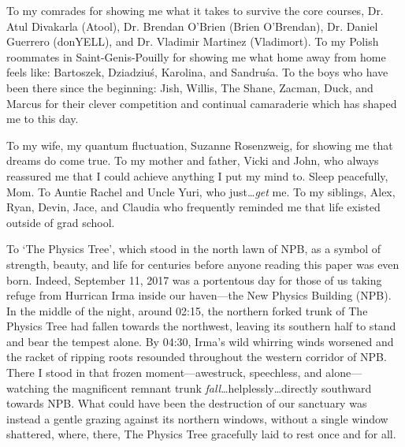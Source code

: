 


To my comrades for showing me what it takes to survive the core courses, Dr. Atul Divakarla (Atool), Dr. Brendan O'Brien (Brien O'Brendan), Dr. Daniel Guerrero (donYELL), and Dr. Vladimir Martinez (Vladimort).
To my Polish roommates in Saint-Genis-Pouilly for showing me what home away from home feels like: Bartoszek, Dziadziuś, Karolina, and Sandruśa.
To the boys who have been there since the beginning: Jish, Willis, The Shane, Zacman, Duck, and Marcus for their clever competition and continual camaraderie which has shaped me to this day.

To my wife, my quantum fluctuation, Suzanne Rosenzweig, for showing me that dreams do come true.
To my mother and father, Vicki and John, who always reassured me that I could achieve anything I put my mind to. Sleep peacefully, Mom.
To Auntie Rachel and Uncle Yuri, who just\ldots \emph{get} me. %
To my siblings, Alex, Ryan, Devin, Jace, and Claudia who frequently reminded me that life existed outside of grad school.


To `The Physics Tree', which stood in the north lawn of NPB, as a symbol of strength, beauty, and life for centuries before anyone reading this paper was even born.
Indeed, September 11, 2017 was a portentous day for those of us taking refuge from Hurrican Irma inside our haven---the New Physics Building (NPB).
In the middle of the night, around 02:15, the northern forked trunk of The Physics Tree had fallen towards the northwest, leaving its southern half to stand and bear the tempest alone.
By 04:30, Irma's wild whirring winds worsened and the racket of ripping roots resounded throughout the western corridor of NPB.
There I stood in that frozen moment---awestruck, speechless, and alone---watching the magnificent remnant trunk \emph{fall}\ldots helplessly\ldots directly southward towards NPB.
What could have been the destruction of our sanctuary was instead a gentle grazing against its northern windows, without a single window shattered, where, there, The Physics Tree gracefully laid to rest once and for all.

